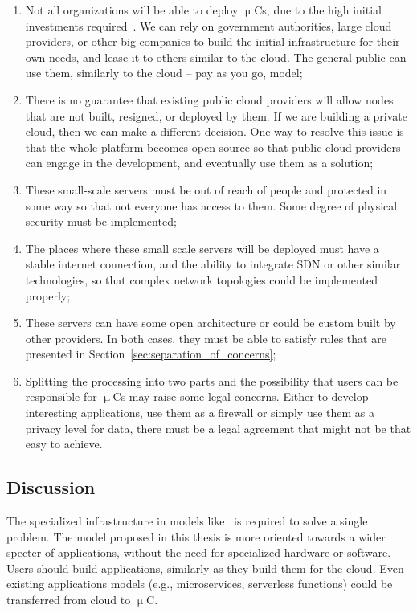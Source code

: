 \begin{enumerate}[start=1,label={(\bfseries \arabic*)}]
	\item Not all organizations will be able to deploy $\upmu$Cs, due to the high initial investments required~\cite{MonsalveCC18}. We can rely on government authorities, large cloud providers, or other big companies to build the initial infrastructure for their own needs, and lease it to others similar to the cloud. The general public can use them, similarly to the cloud -- pay as you go, model;
	\item There is no guarantee that existing public cloud providers will allow nodes that are not built, resigned, or deployed by them. If we are building a private cloud, then  we can make a different decision. One way to resolve this issue is that the whole platform becomes open-source so that public cloud providers can engage in the development, and eventually use them as a solution;
	\item These small-scale servers must be out of reach of people and protected in some way so that not everyone has access to them. Some degree of physical security must be implemented;
	\item The places where these small scale servers will be deployed must have a stable internet connection, and the ability to integrate SDN or other similar technologies, so that complex network topologies could be implemented properly;
	\item These servers can have some open architecture or could be custom built by other providers. In both cases, they must be able to satisfy rules that are presented in Section~\ref{sec:separation_of_concerns};
	\item Splitting the processing into two parts and the possibility that users can be responsible for $\upmu$Cs may raise some legal concerns. Either to develop interesting applications, use them as a firewall or simply use them as a privacy level for data, there must be a legal agreement that might not be that easy to achieve.
\end{enumerate}
%
%
\subsection{Discussion}
%
The specialized infrastructure in models like~\cite{BaccarelliNSSA17, GuoRG20, JeonK19, BCAK19, ChiariniRAMG13} is required to solve a single problem. The model proposed in this thesis is more oriented towards a wider specter of applications, without the need for specialized hardware or software. Users should build applications, similarly as they build them for the cloud. Even existing applications models (e.g., microservices, serverless functions) could be transferred from cloud to $\upmu$C.

